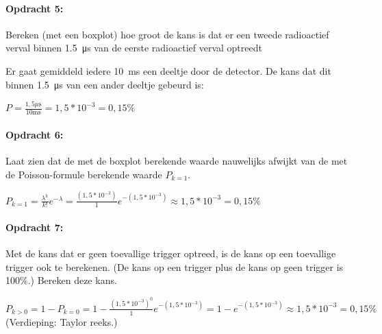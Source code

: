 \begin{minipage}[t]{1\columnwidth}%

\paragraph{Opdracht 5:}

Bereken (met een boxplot) hoe groot de kans is dat er een
tweede radioactief verval binnen \SI{1.5}{\micro\second} van de eerste
radioactief verval optreedt

\bigskip{}

Er gaat gemiddeld iedere \SI{10}{\milli\second} een deeltje door
de detector. De kans dat dit binnen \SI{1.5}{\micro\second} van een
ander deeltje gebeurd is:

\bigskip{}

$P=\frac{1,5\mu\mathrm{s}}{10\mathrm{ms}}=1,5*10^{-3}=0,15\%$%
\end{minipage}

\bigskip{}

\begin{minipage}[t]{1\columnwidth}%

\paragraph{Opdracht 6:}

Laat zien dat de met de boxplot berekende waarde nauwelijks
afwijkt van de met de Poisson-formule berekende waarde $P_{k=1}$.

\bigskip{}

$P_{k=1}=\frac{\lambda^{k}}{k!}e^{-\lambda}=\frac{\left(1,5*10^{-3}\right)}{1}e^{-\left(1,5*10^{-3}\right)}\approx1,5*10^{-3}=0,15\%$%
\end{minipage}

\bigskip{}

\begin{minipage}[t]{1\columnwidth}%

\paragraph{Opdracht 7:}

Met de kans dat er geen toevallige trigger optreed, is de
kans op een toevallige trigger ook te berekenen. (De kans op een trigger
plus de kans op geen trigger is 100\%.) Bereken deze kans.

\bigskip{}

$P_{k>0}=1-P_{k=0}=1-\frac{\left(1,5*10^{-3}\right)^{0}}{1}e^{-\left(1,5*10^{-3}\right)}=1-e^{-\left(1,5*10^{-3}\right)}\approx1,5*10^{-3}=0,15\%$
(Verdieping: Taylor reeks.)%
\end{minipage}

